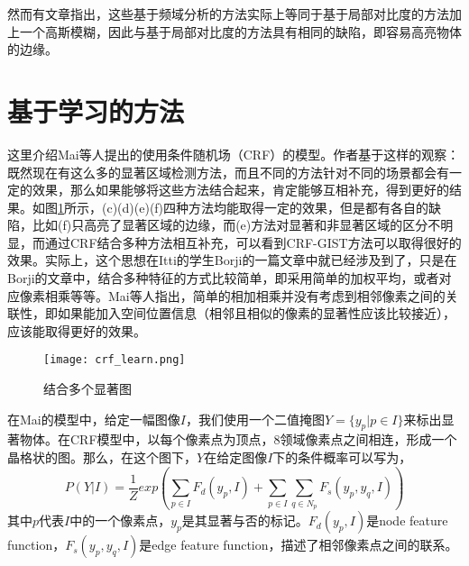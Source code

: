 然而有文章\cite{hou2012image}指出，这些基于频域分析的方法实际上等同于基于局部对比度的方法加上一个高斯模糊，因此与基于局部对比度的方法具有相同的缺陷，即容易高亮物体的边缘。

\section{基于学习的方法}
这里介绍Mai等人\cite{maisaliency}提出的使用条件随机场（CRF）的模型。作者基于这样的观察：既然现在有这么多的显著区域检测方法，而且不同的方法针对不同的场景都会有一定的效果，那么如果能够将这些方法结合起来，肯定能够互相补充，得到更好的结果。如图\ref{fig:crf_learn}所示，(c)(d)(e)(f)四种方法均能取得一定的效果，但是都有各自的缺陷，比如(f)只高亮了显著区域的边缘，而(e)方法对显著和非显著区域的区分不明显，而通过CRF结合多种方法相互补充，可以看到CRF-GIST方法可以取得很好的效果。实际上，这个思想在Itti的学生Borji的一篇文章中\cite{borji2012salient}就已经涉及到了，只是在Borji的文章中，结合多种特征的方式比较简单，即采用简单的加权平均，或者对应像素相乘等等。Mai等人指出\cite{maisaliency}，简单的相加相乘并没有考虑到相邻像素之间的关联性，即如果能加入空间位置信息（相邻且相似的像素的显著性应该比较接近），应该能取得更好的效果。

\begin{figure}[h]
\centering
\texttt{[image: crf\_learn.png]}
\caption{结合多个显著图}\label{fig:crf_learn}
\end{figure}

在Mai的模型中，给定一幅图像$I$，我们使用一个二值掩图$Y=\{y_p|p\in I\}$来标出显著物体。在CRF模型中，以每个像素点为顶点，8领域像素点之间相连，形成一个晶格状的图。那么，在这个图下，$Y$在给定图像$I$下的条件概率可以写为，
\begin{equation}
P(Y|I) = \frac{1}{Z}exp(\sum_{p\in I}F_d(y_p, I) + \sum_{p\in I}\sum_{q\in N_p}F_s(y_p,y_q,I) )
\end{equation}
其中$p$代表$I$中的一个像素点，$y_p$是其显著与否的标记。$F_d(y_p, I)$是node feature function，$F_s(y_p,y_q,I)$是edge feature function，描述了相邻像素点之间的联系。

